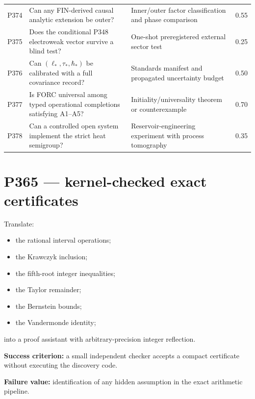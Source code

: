 \documentclass[11pt,a4paper,openany]{report}
\begin{document}
\begin{center}
\begin{longtable}{@{}p{}p{}p{}p{}@{}}
P374 & Can any FIN-derived causal analytic extension be outer? & Inner/\allowbreak{}outer factor classification and phase comparison & 0.55 \\
P375 & Does the conditional P348 electroweak vector survive a blind test? & One-shot preregistered external sector test & 0.25 \\
P376 & Can \((\ell_*,\tau_*,\hbar_*)\) be calibrated with a full covariance record? & Standards manifest and propagated uncertainty budget & 0.50 \\
P377 & Is FORC universal among typed operational completions satisfying A1--A5? & Initiality/\allowbreak{}universality theorem or counterexample & 0.70 \\
P378 & Can a controlled open system implement the strict heat semigroup? & Reservoir-engineering experiment with process tomography & 0.35 \\
\bottomrule
\end{longtable}
\endgroup
\end{center}

\section{P365 --- kernel-checked exact certificates}

Translate:

\begin{itemize}
\item 
the rational interval operations;

\item 
the Krawczyk inclusion;

\item 
the fifth-root integer inequalities;

\item 
the Taylor remainder;

\item 
the Bernstein bounds;

\item 
the Vandermonde identity;

\end{itemize}

into a proof assistant with arbitrary-precision integer reflection.

\textbf{Success criterion:} a small independent checker accepts a compact certificate without executing the discovery code.

\textbf{Failure value:} identification of any hidden assumption in the exact arithmetic pipeline.
\end{document}
